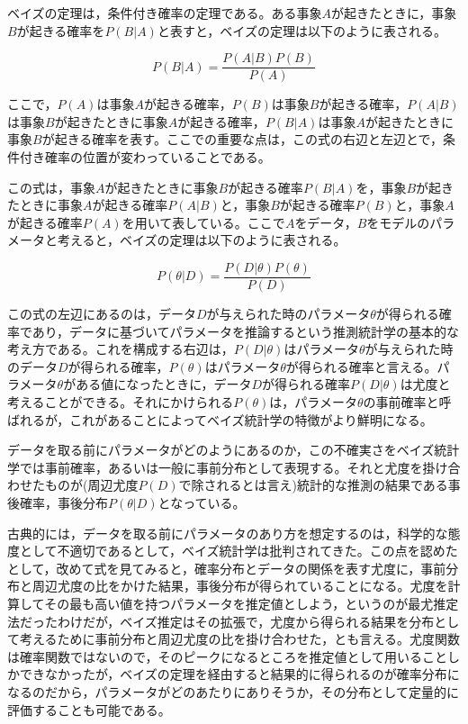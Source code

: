 \documentclass[
  a4paper,
]{ltjsbook}
\begin{document}
ベイズの定理は，条件付き確率の定理である。ある事象\(A\)が起きたときに，事象\(B\)が起きる確率を\(P(B|A)\)と表すと，ベイズの定理は以下のように表される。

\[
P(B|A) = \frac{P(A|B)P(B)}{P(A)}
\]

ここで，\(P(A)\)は事象\(A\)が起きる確率，\(P(B)\)は事象\(B\)が起きる確率，\(P(A|B)\)は事象\(B\)が起きたときに事象\(A\)が起きる確率，\(P(B|A)\)は事象\(A\)が起きたときに事象\(B\)が起きる確率を表す。ここでの重要な点は，この式の右辺と左辺とで，条件付き確率の位置が変わっていることである。

この式は，事象\(A\)が起きたときに事象\(B\)が起きる確率\(P(B|A)\)を，事象\(B\)が起きたときに事象\(A\)が起きる確率\(P(A|B)\)と，事象\(B\)が起きる確率\(P(B)\)と，事象\(A\)が起きる確率\(P(A)\)を用いて表している。ここで\(A\)をデータ，\(B\)をモデルのパラメータと考えると，ベイズの定理は以下のように表される。

\[
P(\theta|D) = \frac{P(D|\theta)P(\theta)}{P(D)}
\]

この式の左辺にあるのは，データ\(D\)が与えられた時のパラメータ\(\theta\)が得られる確率であり，データに基づいてパラメータを推論するという推測統計学の基本的な考え方である。これを構成する右辺は，\(P(D|\theta)\)はパラメータ\(\theta\)が与えられた時のデータ\(D\)が得られる確率，\(P(\theta)\)はパラメータ\(\theta\)が得られる確率と言える。パラメータ\(\theta\)がある値になったときに，データ\(D\)が得られる確率\(P(D|\theta)\)は尤度と考えることができる。それにかけられる\(P(\theta)\)は，パラメータ\(\theta\)の事前確率と呼ばれるが，これがあることによってベイズ統計学の特徴がより鮮明になる。

データを取る前にパラメータがどのようにあるのか，この不確実さをベイズ統計学では事前確率，あるいは一般に事前分布として表現する。それと尤度を掛け合わせたものが(周辺尤度\(P(D)\)で除されるとは言え)統計的な推測の結果である事後確率，事後分布\(P(\theta|D)\)となっている。

古典的には，データを取る前にパラメータのあり方を想定するのは，科学的な態度として不適切であるとして，ベイズ統計学は批判されてきた。この点を認めたとして，改めて式を見てみると，確率分布とデータの関係を表す尤度に，事前分布と周辺尤度の比をかけた結果，事後分布が得られていることになる。尤度を計算してその最も高い値を持つパラメータを推定値としよう，というのが最尤推定法だったわけだが，ベイズ推定はその拡張で，尤度から得られる結果を分布として考えるために事前分布と周辺尤度の比を掛け合わせた，とも言える。尤度関数は確率関数ではないので，そのピークになるところを推定値として用いることしかできなかったが，ベイズの定理を経由すると結果的に得られるのが確率分布になるのだから，パラメータがどのあたりにありそうか，その分布として定量的に評価することも可能である。
\end{document}
